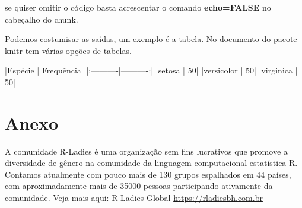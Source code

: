 \documentclass[12pt,a4paper]{article}
\begin{document}
se quiser omitir o código basta acrescentar o comando \textbf{echo=FALSE} no cabeçalho do chunk.

Podemos costumisar as saídas, um exemplo é a tabela. No documento do pacote knitr tem várias opções de tabelas.

\begin{Schunk}
\begin{Soutput}
|Espécie    | Frequência|
|:----------|----------:|
|setosa     |         50|
|versicolor |         50|
|virginica  |         50|
\end{Soutput}
\end{Schunk}


\newpage %


%
  



\appendix{}

\section{Anexo}

A comunidade R-Ladies é uma organização sem fins lucrativos que promove a diversidade de gênero na comunidade da linguagem computacional estatística R. Contamos atualmente com pouco mais de 130 grupos espalhados em 44 países, com aproximadamente mais de 35000 pessoas participando ativamente da comunidade. Veja mais aqui: R-Ladies Global \url{https://rladiesbh.com.br}
\end{document}
